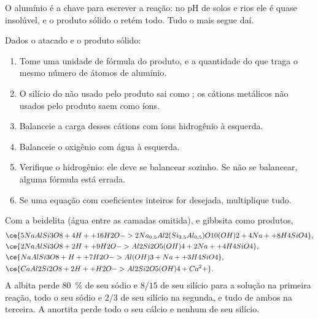 O alumínio é a chave para escrever a reação: no pH de solos e rios ele é quase insolúvel, e o produto sólido o retém todo. Tudo o mais segue daí.

\begin{method}\label{met:b1:weathering-clays:balance}
Dados o  atacado e o produto sólido:
\begin{enumerate}
  \item Tome uma unidade de fórmula do produto, e a quantidade do  que traga o mesmo número de átomos de alumínio.
  \item O silício do  não usado pelo produto sai como ; os cátions metálicos não usados pelo produto saem como íons.
  \item Balanceie a carga desses cátions com íons hidrogênio à esquerda.
  \item Balanceie o oxigênio com água à esquerda.
  \item Verifique o hidrogênio: ele deve se balancear sozinho. Se não se balancear, alguma fórmula está errada.
  \item Se uma equação com coeficientes inteiros for desejada, multiplique tudo.
\end{enumerate}
\end{method}

\begin{proposition}\label{prop:b1:weathering-clays:feldspars}
Com a  beidelita 
(água entre as camadas omitida),   e gibbsita
 como produtos,
\begin{align*}
&\ce{5 NaAlSi3O8 + 4 H+ + 16 H2O -> 2 Na_{0.5}Al2(Si_{3.5}Al_{0.5})O10(OH)2 + 4 Na+ + 8 H4SiO4},\\ %
&\ce{2 NaAlSi3O8 + 2 H+ + 9 H2O -> Al2Si2O5(OH)4 + 2 Na+ + 4 H4SiO4},\\
&\ce{NaAlSi3O8 + H+ + 7 H2O -> Al(OH)3 + Na+ + 3 H4SiO4},\\
&\ce{CaAl2Si2O8 + 2 H+ + H2O -> Al2Si2O5(OH)4 + Ca^2+}.
\end{align*}
A albita perde \qty{80}{\percent} de seu sódio e $8/15$ de seu silício para a solução na primeira reação, todo o seu sódio e $2/3$ de seu silício na segunda, e tudo de ambos na terceira. A anortita perde todo o seu cálcio e nenhum de seu silício.
\end{proposition}

